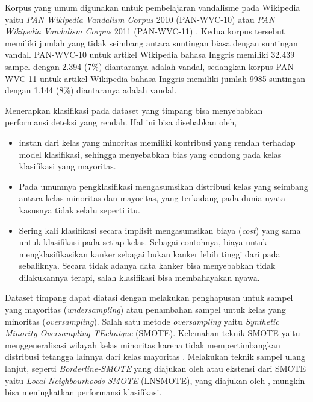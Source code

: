 Korpus yang umum digunakan untuk pembelajaran vandalisme pada Wikipedia yaitu
\textit{PAN Wikipedia Vandalism Corpus} 2010 (PAN-WVC-10)
atau
\textit{PAN Wikipedia Vandalism Corpus} 2011 (PAN-WVC-11)
\parencite{potthast:2010b}.
Kedua korpus tersebut memiliki jumlah yang tidak seimbang antara suntingan
biasa dengan suntingan vandal.
PAN-WVC-10 untuk artikel Wikipedia bahasa Inggris memiliki 32.439 sampel dengan
2.394 (7\%) diantaranya adalah vandal, sedangkan korpus PAN-WVC-11 untuk
artikel Wikipedia bahasa Inggris memiliki jumlah 9985 suntingan dengan 1.144
(8\%) diantaranya adalah vandal.

Menerapkan klasifikasi pada dataset yang timpang bisa menyebabkan performansi
deteksi yang rendah.
Hal ini bisa disebabkan oleh,
\begin{itemize}
	\item instan dari kelas yang minoritas memiliki kontribusi yang rendah
	terhadap model klasifikasi, sehingga menyebabkan bias yang condong pada
	kelas klasifikasi yang mayoritas.
	\item Pada umumnya pengklasifikasi mengasumsikan distribusi kelas yang
	seimbang antara kelas minoritas dan mayoritas, yang terkadang pada
	dunia nyata kasusnya tidak selalu seperti itu.
	\item Sering kali klasifikasi secara implisit mengasumsikan biaya
	(\textit{cost}) yang sama untuk klasifikasi pada setiap kelas.
	Sebagai contohnya, biaya untuk mengklasifikasikan kanker sebagai bukan
	kanker lebih tinggi dari pada sebaliknya.
	Secara tidak adanya data kanker bisa menyebabkan tidak dilakukannya
	terapi, salah klasifikasi bisa membahayakan nyawa.
\end{itemize}

\vspace{1.5em}
Dataset timpang dapat diatasi dengan melakukan penghapusan untuk sampel yang
mayoritas (\textit{undersampling}) atau penambahan sampel untuk kelas
yang minoritas (\textit{oversampling}).
Salah satu metode \textit{oversampling} yaitu \textit{Synthetic Minority
Oversampling TEchnique} (SMOTE).
Kelemahan teknik SMOTE yaitu menggeneralisasi wilayah kelas
minoritas karena tidak mempertimbangkan distribusi tetangga lainnya dari
kelas mayoritas
\parencite{maciejewski2011local}.
Melakukan teknik sampel ulang lanjut, seperti
\textit{Borderline-SMOTE}
yang diajukan oleh
\textcite{han2005borderline}
atau ekstensi dari SMOTE yaitu \textit{Local-Neighbourhoods SMOTE} (LNSMOTE), yang
diajukan oleh
\textcite{maciejewski2011local},
mungkin bisa meningkatkan performansi klasifikasi.


